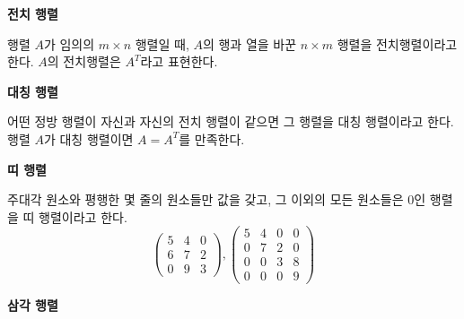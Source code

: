 \newpage
\begin{flushleft}
    {\textcolor{subheader}{{\LARGE\textbf{전치 행렬}}}}
\end{flushleft}

\begin{tcolorbox}[colback = white, colframe = Definition, title = \textmd{정의: 전치 행렬}]
    행렬 $A$가 임의의 $m \times n$ 행렬일 때, $A$의 행과 열을 바꾼 $n \times m$ 행렬을 전치행렬이라고 한다. $A$의 전치행렬은 $A^T$라고 표현한다.
\end{tcolorbox}

\bigskip
\begin{flushleft}
    {\textcolor{subheader}{{\LARGE\textbf{대칭 행렬}}}}
\end{flushleft}

\begin{tcolorbox}[colback = white, colframe = Definition, title = \textmd{정의: 대칭 행렬}]
    어떤 정방 행렬이 자신과 자신의 전치 행렬이 같으면 그 행렬을 대칭 행렬이라고 한다. 행렬 $A$가 대칭 행렬이면 $A = A^T$를 만족한다.
\end{tcolorbox}

\bigskip
\begin{flushleft}
    {\textcolor{subheader}{{\LARGE\textbf{띠 행렬}}}}
\end{flushleft}

\begin{tcolorbox}[colback = white, colframe = Definition, title = \textmd{정의: 띠 행렬}]
    주대각 원소와 평행한 몇 줄의 원소들만 값을 갖고, 그 이외의 모든 원소들은 $0$인 행렬을 띠 행렬이라고 한다.
    \[ \begin{pmatrix} 5 & 4 & 0 \\ 6 & 7 & 2 \\ 0 & 9 & 3 \end{pmatrix}, 
    \begin{pmatrix} 5 & 4 & 0 & 0 \\ 0 & 7 & 2 & 0 \\ 0 & 0 & 3 & 8 \\ 0 & 0 & 0 & 9\end{pmatrix} \]
\end{tcolorbox}

\bigskip
\begin{flushleft}
    {\textcolor{subheader}{{\LARGE\textbf{삼각 행렬}}}}
\end{flushleft}

